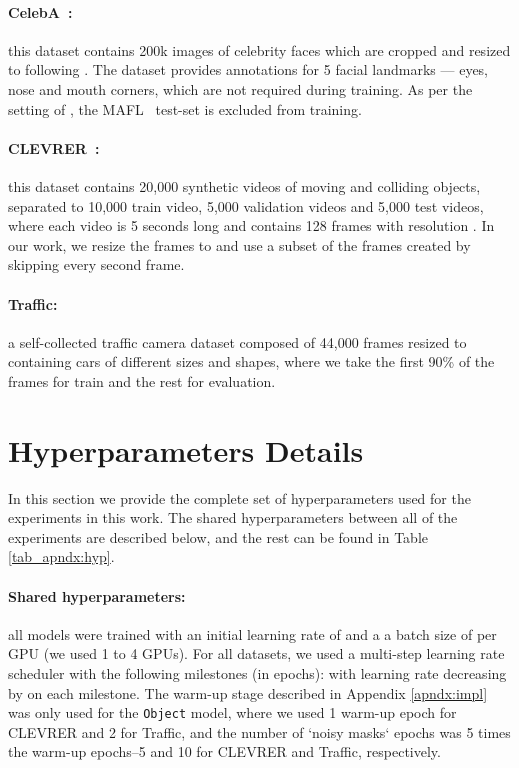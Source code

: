 \documentclass[nohyperref]{article}
\theoremstyle{plain}
\theoremstyle{definition}
\theoremstyle{remark}
\begin{document}
\paragraph{CelebA~\cite{liu2015faceattributes}:} this dataset contains 200k images of celebrity faces which are cropped and resized to  following \citet{jakab2018unsupervised, thewlis2017unsupervised1}. The dataset provides
annotations for 5 facial landmarks — eyes, nose and mouth corners, which are not required during training. As per the setting of \cite{jakab2018unsupervised, thewlis2017unsupervised1}, the MAFL~\citep{zhang2014facial} test-set is excluded from training.

\paragraph{CLEVRER~\cite{yi2019clevrer}:} this dataset contains 20,000 synthetic videos of moving and colliding objects, separated to 10,000 train video, 5,000 validation videos and 5,000 test videos, where each video is 5 seconds long and contains 128 frames with resolution . In our work, we resize the frames to  and use a subset of the frames created by skipping every second frame.

\paragraph{Traffic:} a self-collected traffic camera dataset composed of 44,000 frames resized to  containing cars of different sizes and shapes, where we take the first 90\% of the frames for train and the rest for evaluation.

\section{Hyperparameters Details}
\label{apndx:hyp}
In this section we provide the complete set of hyperparameters used for the experiments in this work. The shared hyperparameters between all of the experiments are described below, and the rest can be found in Table \ref{tab_apndx:hyp}.

\paragraph{Shared hyperparameters:} all models were trained with an initial learning rate of  and a a batch size of  per GPU (we used 1 to 4 GPUs). For all datasets, we used a multi-step learning rate scheduler with the following milestones (in epochs):  with learning rate decreasing by  on each milestone. The warm-up stage described in Appendix \ref{apndx:impl} was only used for the \texttt{Object} model, where we used 1 warm-up epoch for CLEVRER and 2 for Traffic, and the number of `noisy masks` epochs was 5 times the warm-up epochs--5 and 10 for CLEVRER and Traffic, respectively.
\end{document}
